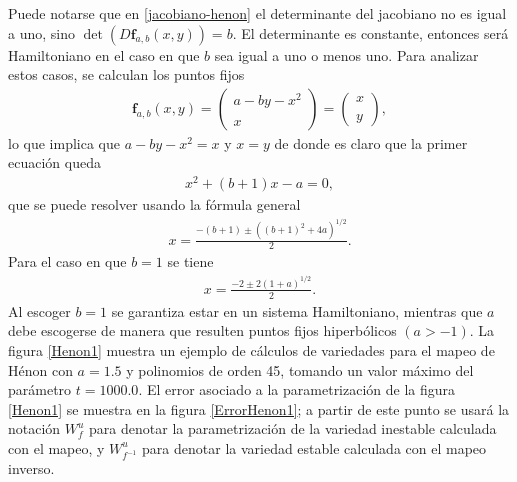                 
Puede notarse que en \eqref{jacobiano-henon} el determinante del jacobiano no es igual a uno, sino $\det(D\mathbf{f}_{a,b}(x,y))=b$.
El determinante es constante, entonces será Hamiltoniano en el caso en que $b$ sea igual a uno o menos uno. Para analizar estos casos, se calculan los puntos fijos
\begin{eqnarray}
\mathbf{f}_{a,b}(x,y)=\left( \begin{array}{lcc}
               a-by-x^{2}\\
               \\ x
               \end{array}
               \right) = \left(\begin{array}{lc}
               x \\
               \\ y
               \end{array}
               \right),
\end{eqnarray}        
lo que implica que $a-by-x^{2}=x$ y $x=y$ de donde es claro que la primer ecuación queda
\begin{eqnarray*}
x^{2}+(b+1)x-a=0, 
\end{eqnarray*}
que se puede resolver usando la fórmula general
\begin{eqnarray*}
x=\frac{-(b+1)\pm ((b+1)^{2}+4a)^{1/2} }{2}.
\end{eqnarray*}
Para el caso en que $b=1$ se tiene
\begin{eqnarray}
x=\frac{-2\pm 2(1+a)^{1/2} }{2}.
\end{eqnarray}
Al escoger $b=1$ se garantiza estar en un sistema Hamiltoniano, mientras que $a$ debe escogerse de manera que resulten puntos fijos hiperbólicos $(a>-1)$. La figura \ref{Henon1} muestra un ejemplo de cálculos de variedades para el mapeo de Hénon con $a=1.5$ y polinomios de orden 45, tomando un valor máximo del parámetro $t=1000.0$. El error asociado a la parametrización de la figura \ref{Henon1} se muestra en la figura \ref{ErrorHenon1}; a partir de este punto se usará la notación $W_{f}^{u}$ para denotar la parametrización de la variedad inestable calculada con el mapeo, y $W_{f^{-1}}^{u}$ para denotar la variedad estable calculada con el mapeo inverso.

